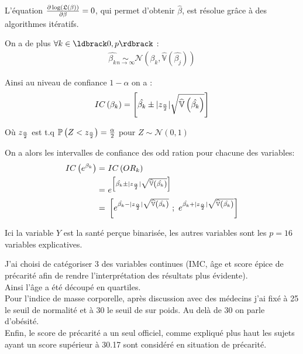 \documentclass{book}
\begin{document}
\bigskip

\noindent
L'équation $ {{\partial  \log \left( \mathfrak{L}(\beta) \right)} \over {\partial \beta} } = 0  $, qui permet d'obtenir $\hat{\beta}$, est résolue grâce à des algorithmes itératifs.\\

\bigskip

\noindent
On a de plus $\forall k \in \ldbrack 0,p \rdbrack$ :
\begin{align*}
\hat{\beta_k} \underset{n \rightarrow \infty}{\sim} \mathcal{N} \left( \beta_k,\widehat{\mathbb{V}} \left(  \hat{\beta_j}\right) \right)
\end{align*}

\bigskip

\noindent
Ainsi au niveau de confiance $1-\alpha$ on a :
\begin{align*}
IC \left( \beta_k \right) =
 \left[
  \hat{\beta_k} \pm |z_{{\alpha} \over {2}}| \sqrt{\widehat{\mathbb{V}}\left( \hat{\beta_k} \right)}
\right]\\
\end{align*}

\noindent
Où $ z_{ {\alpha} \over {2}} $ est t.q $ \mathbb{P}\left( Z <  z_{ {\alpha} \over {2}} \right) = {{\alpha} \over {2}}$ pour $ Z \sim \mathcal{N}(0,1) $

\bigskip

\noindent
On a alors les intervalles de confiance des odd ration pour chacune des variables:\\
\begin{align*}
IC \left( e^{\beta_k} \right)  =& ~ IC \left( OR_k \right) \\
= & ~ e^{\left[ \hat{\beta_k} \pm |z_{{\alpha} \over {2}}| \sqrt{\widehat{\mathbb{V}}\left( \hat{\beta_k} \right)} \right]} \\
= & ~
 \left[
e^{\hat{\beta_k} - |z_{{\alpha} \over {2}}| \sqrt{\widehat{\mathbb{V}}\left( \hat{\beta_k} \right)}} 
~;~ 
e^{\hat{\beta_k} + |z_{{\alpha} \over {2}}| \sqrt{\widehat{\mathbb{V}}\left( \hat{\beta_k} \right)}} 
\right]
\end{align*}

\bigskip
\noindent
Ici la variable $Y$ est la santé perçue binarisée, les autres variables sont les $p = 16 $ variables explicatives.

\bigskip

\noindent
J'ai choisi de catégoriser 3 des variables continues (IMC, âge et score épice de précarité afin de rendre l'interprétation des résultats plus évidente).\\
Ainsi l'âge a été découpé en quartiles.\\
Pour l'indice de masse corporelle, après discussion avec des médecins j'ai fixé à 25 le seuil de normalité et à 30 le seuil de sur poids. Au delà de 30 on parle d'obésité.\\
Enfin, le score de précarité a un seul officiel, comme expliqué plus haut les sujets ayant un score supérieur à 30.17 sont considéré en situation de précarité.\\
\end{document}
